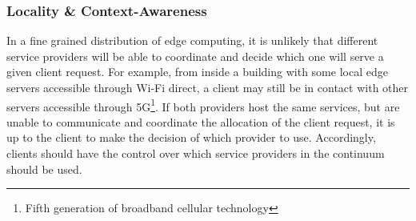 






\subsubsection*{Locality \& Context-Awareness}\label{sec:context-awareness}


In a fine grained distribution of edge computing, it is unlikely that different service providers will be able to coordinate and decide which one will serve a given client request. For example, from inside a building with some local edge servers accessible through Wi-Fi direct, a client may still be in contact with other servers accessible through 5G\footnote{Fifth generation of broadband cellular technology}. If both providers host the same services, but are unable to communicate and coordinate the allocation of the client request, it is up to the client to make the decision of which provider to use. Accordingly, clients should have the control over which service providers in the continuum should be used. %

